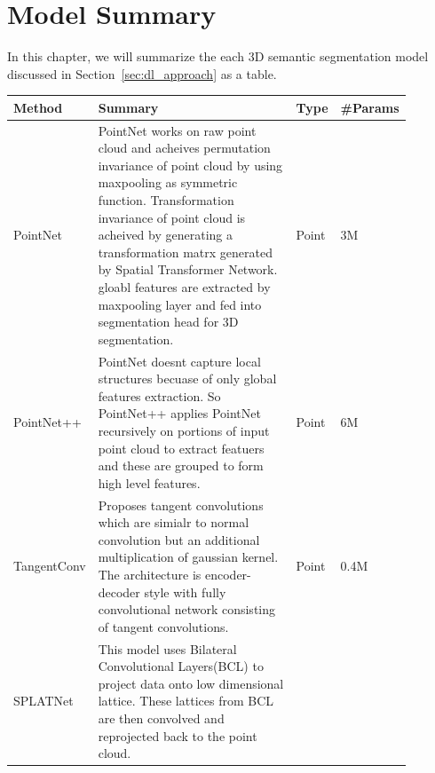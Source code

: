 


    \chapter{Model Summary}
    In this chapter, we will summarize the each 3D semantic segmentation model discussed in Section~\ref{sec:dl_approach} as a table.

    \begin{longtable}{|p{0.15\linewidth} | p{0.59\linewidth}| p{0.06\linewidth} |p{0.09\linewidth}|}
            \hline
            \textbf{Method} & \textbf{Summary} & \textbf{Type} & \textbf{\#Params} \\
            \hline 
            PointNet\cite{Qi_2017_CVPR_pointnet} &
            PointNet works on raw point cloud and acheives permutation invariance of point cloud by using maxpooling as symmetric function.
            Transformation invariance of point cloud is acheived by generating a transformation matrx generated by Spatial Transformer Network.
            gloabl features are extracted by maxpooling layer and fed into segmentation head for 3D segmentation.
            & Point & 3M \\
            \hline
            PointNet++\cite{qi2017pointnet++} &
            PointNet doesnt capture local structures becuase of only global features extraction.
            So PointNet++ applies PointNet recursively on portions of input point cloud to extract featuers and these are grouped to form high level features.
            & Point & 6M \\
            \hline
            TangentConv\cite{Tatarchenko_2018_CVPR_tangconv} &
            Proposes tangent convolutions which are simialr to normal convolution but an additional multiplication of gaussian kernel.
            The architecture is encoder-decoder style with fully convolutional network consisting of tangent convolutions.
            & Point & 0.4M\\
            \hline
            SPLATNet\cite{Su_2018_CVPR_splatnet} &
            This model uses Bilateral Convolutional Layers(BCL) to project data onto low dimensional lattice.
            These lattices from BCL are then convolved and reprojected back to the point cloud.

\end{longtable}
